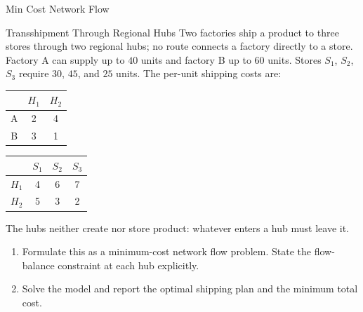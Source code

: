 \begin{ex}{Min Cost Network Flow}{}
\begin{center}
\par{}\label{fig:modeling-sums-continued-tikz12}%

   \end{center}
\exrefs{\S\ref{sec:min-cost-network-flow}}
   \end{ex}

\begin{ex}{Transshipment Through Regional Hubs}{}
\label{ex:transshipment-hubs}
 Two factories ship a product to three stores through two regional hubs; no route connects a factory directly to a store.  Factory A can supply up to $40$ units and factory B up to $60$ units.  Stores $S_1$, $S_2$, $S_3$ require $30$, $45$, and $25$ units.  The per-unit shipping costs are:
\begin{center}
\begin{tabular}{c|c|c}
 & $H_1$ & $H_2$ \\
\hline
A & 2 & 4 \\
B & 3 & 1 \\
\end{tabular}
\qquad
\begin{tabular}{c|c|c|c}
 & $S_1$ & $S_2$ & $S_3$ \\
\hline
$H_1$ & 4 & 6 & 7 \\
$H_2$ & 5 & 3 & 2 \\
\end{tabular}
\par{}\label{tab:modeling-sums-continued-tab05}%

\end{center}
The hubs neither create nor store product: whatever enters a hub must leave it.
\begin{enumerate}
\item Formulate this as a minimum-cost network flow problem.  State the flow-balance constraint at each hub explicitly.
\item Solve the model and report the optimal shipping plan and the minimum total cost.
\end{enumerate}
\exrefs{\S\ref{sec:min-cost-network-flow}}
\end{ex}


